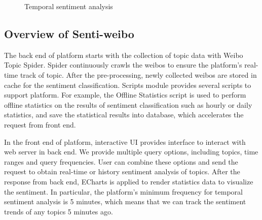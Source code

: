 \documentclass[runningheads]{llncs}
\begin{document}
\begin{figure}[ht]
\centering  %
\caption{Temporal sentiment analysis}
\label{fig:sentiment-trend}
\end{figure}

\subsection{Overview of Senti-weibo}

The back end of platform starts with the collection of topic data with Weibo Topic Spider. Spider continuously crawls the weibos to ensure the platform's real-time track of topic. After the pre-processing, newly collected weibos are stored in cache for the sentiment classification. Scripts module provides several scripts to support platform. For example, the Offline Statistics script is used to perform offline statistics on the results of sentiment classification such as hourly or daily statistics, and save the statistical results into database, which accelerates the request from front end. 

In the front end of platform, interactive UI provides interface to interact with web server in back end. We provide multiple query options, including topics, time ranges and query frequencies. User can combine these options and send the request to obtain real-time or history sentiment analysis of topics. After the response from back end, ECharts \cite{li2018echarts} is applied to render statistics data to visualize the sentiment. In particular, the platform's minimum frequency for temporal sentiment analysis is 5 minutes, which means that we can track the sentiment trends of any topics 5 minutes ago.
\end{document}
